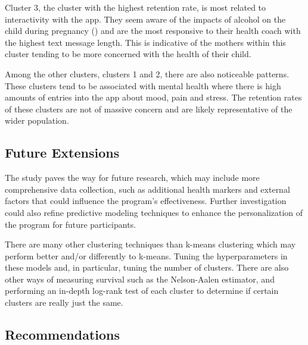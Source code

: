 \documentclass[12pt]{article}
\begin{document}
		Cluster 3, the cluster with the highest retention rate, is most related to interactivity with the app. They seem aware of the impacts of alcohol on the child during pregnancy (\cite{dejongk1}) and are the most responsive to their health coach with the highest text message length. This is indicative of the mothers within this cluster tending to be more concerned with the health of their child.
		
		Among the other clusters, clusters 1 and 2, there are also noticeable patterns. These clusters tend to be associated with mental health where there is high amounts of entries into the app about mood, pain and stress. The retention rates of these clusters are not of massive concern and are likely representative of the wider population.
		
		\subsection{Future Extensions}
		
		The study paves the way for future research, which may include more comprehensive data collection, such as additional health markers and external factors that could influence the program's effectiveness. Further investigation could also refine predictive modeling techniques to enhance the personalization of the program for future participants.
		
		There are many other clustering techniques than k-means clustering which may perform better and/or differently to k-means. Tuning the hyperparameters in these models and, in particular, tuning the number of clusters. There are also other ways of measuring survival such as the Nelson-Aalen estimator, and performing an in-depth log-rank test of each cluster to determine if certain clusters are really just the same.
		
		\subsection{Recommendations}
	


\newpage
%
%

\setlength{\bibhang}{0pt}

\raggedright

\end{document}
